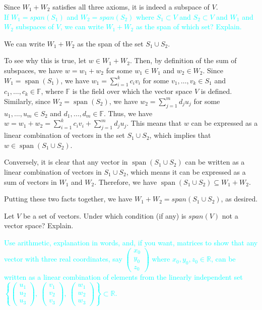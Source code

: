\documentclass[fontsize=12pt]{scrartcl}
\begin{document}
Since $W_1 + W_2$ satisfies all three axioms, it is indeed a subspace of $V$.
\\

\noindent
\textcolor{cyan}{If $W_1 = span(S_1)$ and $W_2 = span(S_2)$ where $S_1 \subset V$ and $S_2 \subset V$ and $W_1$ and $W_2$ subspaces of $V$, we can write $W_1 + W_2$ as the span of which set? Explain.}

\noindent 
We can write $W_1 + W_2$ as the span of the set $S_1 \cup S_2$.

\noindent
To see why this is true, let $w \in W_1 + W_2$. Then, by definition of the sum of subspaces, we have $w = w_1 + w_2$ for some $w_1 \in W_1$ and $w_2 \in W_2$. Since $W_1 = \operatorname{span}(S_1)$, we have $w_1 = \sum_{i=1}^k c_i v_i$ for some $v_1,\dots,v_k \in S_1$ and $c_1,\dots,c_k \in \mathbb{F}$, where $\mathbb{F}$ is the field over which the vector space $V$ is defined. Similarly, since $W_2 = \operatorname{span}(S_2)$, we have $w_2 = \sum_{j=1}^m d_j u_j$ for some $u_1,\dots,u_m \in S_2$ and $d_1,\dots,d_m \in \mathbb{F}$. Thus, we have $w = w_1 + w_2 = \sum^{k}_{i=1}c_iv_i + \sum^{m}_{j=1}d_ju_j$. This means that $w$ can be expressed as a linear combination of vectors in the set $S_1 \cup S_2$, which implies that $w \in \operatorname{span}(S_1 \cup S_2)$.

\noindent
Conversely, it is clear that any vector in $\operatorname{span}(S_1 \cup S_2)$ can be written as a linear combination of vectors in $S_1 \cup S_2$, which means it can be expressed as a sum of vectors in $W_1$ and $W_2$. Therefore, we have $\operatorname{span}(S_1 \cup S_2) \subseteq W_1 + W_2$.

\noindent
Putting these two facts together, we have $W_1 + W_2 = span(S_1 \cup S_2)$, as desired.



\noindent
Let $V$ be a set of vectors. Under which condition (if any) is $span(V)$ not a vector space? Explain.

\newpage

\noindent
\textcolor{cyan}{Use arithmetic, explanation in words, and, if you want, matrices to show that any vector with three real coordinates, say $\left( \begin{array}{c} x_0 \\ y_0 \\ z_0 \end{array}\right)$  where $x_0, y_0, z_0 \in \mathbb{R}$, can be written as a linear combination of elements from the linearly independent set \\
$\left\{ \left(\begin{array}{c} u_1 \\ u_2 \\ u_3 \end{array}\right) , \ \left(\begin{array}{c} v_1 \\ v_2 \\ v_3 \end{array}\right) , \ \left(\begin{array}{c} w_1 \\ w_2 \\ w_3 \end{array}\right) \right\} \subset \mathbb{R}$.}
\end{document}
